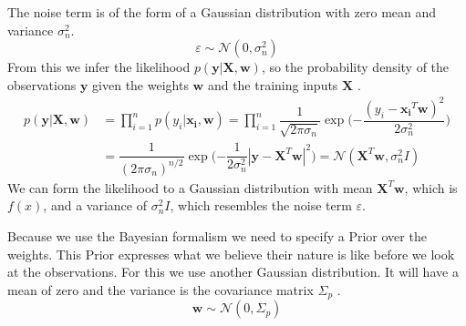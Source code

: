 The noise term is of the form of a Gaussian distribution with zero mean and variance $\sigma_n^2$.
\begin{equation}\label{noise_term}
\varepsilon \sim \mathcal{N}(0,\sigma_n^2)
\end{equation}
From this we infer the likelihood $p(\mathbf{y}|\mathbf{X},\mathbf{w})$, so the probability density of the observations $\mathbf{y}$ given the weights $\mathbf{w}$ and the training inputs $\mathbf{X}$ \citep[p.\ 9]{Rasmussen:2005:GPM:1162254}.
\begin{equation}\label{eq:likelihood}
\begin{aligned}
p(\mathbf{y}|\mathbf{X},\mathbf{w}) &= \prod_{i=1}^{n}p(y_i|\mathbf{x_i},\mathbf{w}) = \prod_{i=1}^{n}\dfrac{1}{\sqrt{2\pi\sigma_n}}\exp\big({-\dfrac{(y_i-\mathbf{x_i}^T\mathbf{w})^2}{2\sigma_n^2}}\big)\\
& = \dfrac{1}{(2\pi\sigma_n)^{n/2}}\exp\big({-\dfrac{1}{2\sigma_n^2}|\mathbf{y}-\mathbf{X}^T\mathbf{w}|^2}\big) = \mathcal{N}(\mathbf{X}^T\mathbf{w},\sigma_n^2I)
\end{aligned}
\end{equation}
We can form the likelihood to a Gaussian distribution with mean $\mathbf{X}^T\mathbf{w}$, which is $f(x)$, and a variance of $\sigma_n^2I$, which resembles the noise term $\varepsilon$.

Because we use the Bayesian formalism we need to specify a \gls{Prior} over the weights. This \gls{Prior} expresses what we believe their nature is like before we look at the observations. For this we use another Gaussian distribution. It will have a mean of zero and the variance is the covariance matrix $\Sigma_p$ \citep[p.\ 9]{Rasmussen:2005:GPM:1162254}.
\begin{equation}\label{eq:weight_prior}
\mathbf{w} \sim \mathcal{N}(0,\Sigma_p)
\end{equation}

